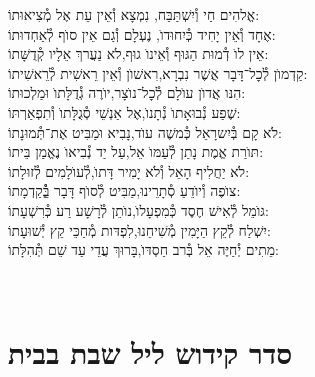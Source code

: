 \documentclass[twoside, openany, parskip=half, 11pt]{book}
\begin{document}
אֱלהִים חַי וְ֯יִשְׁתַּבַּח, \hfill נִמְצָא וְ֯אֵין עֵת אֶל מְ֯צִיאוּתוֹ: \\
אֶחָד וְ֯אֵין יָחִיד כְּ֯יִחוּדוׂ, \hfill נֶעְלָם וְ֯גַם אֵין סוׂף לְ֯אַחְדוּתוֹ: \\
אֵין לוׂ דְ֯מוּת הַגּוּף וְ֯אֵינוׂ גוּף,\hfill לׂא נַעֲרךְ אֵלָיו קְ֯דֻשָּׁתוֹ: \\
קַדְמוׂן לְ֯כׇל־דָּבָר אֲשֶׁר נִבְרָא,\hfill רִאשׁוׂן וְ֯אֵין רֵאשִׁית לְ֯רֵאשִׁיתוֹ: \\
הִנּו אֲדוׂן עוׂלָם לְ֯כׇל־נוׂצָר,\hfill יוׂרֶה גְ֯דֻלָּתוׂ וּמַלְכוּתוֹ: \\
שֶׁפַע נְ֯בוּאָתוׂ נְ֯תָנוׂ,\hfill אֶל אַנְשֵׁי סְ֯גֻלָּתוׂ וְ֯תִפְאַרְתּוֹ: \\
לׂא קָם בְּ֯יִשרָאֵל כְּ֯משֶׁה עוׂד,\hfill נָבִיא וּמַבִּיט אֶת־תְּ֯מוּנָתוֹ: \\
תּוׂרַת אֱמֶת נָתַן לְ֯עַמּוׂ אֵל,\hfill עַל יַד נְ֯בִיאוׂ נֶאֱמַן בֵּיתוֹ: \\
לׂא יַחֲלִיף הָאֵל וְ֯לׂא יָמִיר דָּתוׂ,\hfill לְ֯עוׂלָמִים לְ֯זוּלָתוֹ: \\
צוׂפֶה וְ֯יוׂדֵעַ סְ֯תָרֵינוּ,\hfill מַבִּיט לְ֯סוׂף דָּבָר בְְַּ֯֯קַדְמָתוֹ: \\
גּוׂמֵל לְ֯אִישׁ חֶסֶד כְּ֯מִפְעָלוׂ,\hfill נוׂתֵן לְ֯רָשָׁע רַע כְּ֯רִשְׁעָתוֹ: \\
יִשְׁלַח לְ֯קֵץ הַיָּמִין מְ֯שִׁיחֵנוּ,\hfill לִפְדּות מְ֯חַכֵּי קֵץ יְ֯שׁוּעָתוֹ: \\
מֵתִים יְ֯חַיֶּה אֵל בְּ֯רב חַסְדּוׂ,\hfill בָּרוּךְ עֲדֵי עַד שֵׁם תְּ֯הִלָּתוֹ:\\

\vfill

\quad{}\quad{}\\

\chapter[קידוש ליל שבת]{ סדר קידוש ליל שבת בבית }



\medskip

\newcommand{\birkashabonim}{
\ssubsection{\adforn{18} ברכת הבנים \adforn{17}}

\source{בראשית מח} \begin{tabular}{>{\centering\arraybackslash}m{.4\textwidth} | >{\centering\arraybackslash}m{.4\textwidth}}
\instruction{לבנים} & \instruction{לבנות} \\
יְשִֽׂמְ֯ךָ֣ אֱלֹהִ֔ים כְּ֯אֶפְרַ֖יִם וְ֯כִמְנַשֶׁ֑ה &
יְשִׂמֵךְ אֱלׂהִים כְּ֯שָׂרָה, רִבְקָה, רָחֵל, וְ֯לֵאָה
\end{tabular}


יְבָֽרֶכְ֯ךָ֥
\source{במידבר ו}
יְיָ֖ וְ֯יִשְׁמְ֯רֶֽךָ׃\\
יָאֵ֨ר יְיָ֧ פָּנָ֛יו אֵלֶ֖יךָ וִֽיחֻנֶּֽךָּ׃\\
יִשָּׂ֨א יְיָ֤ פָּנָיו֙ אֵלֶ֔יךָ וְ֯יָשֵׂ֥ם לְ֯ךָ֖ שָׁלֽוֹם׃


}
\end{document}
